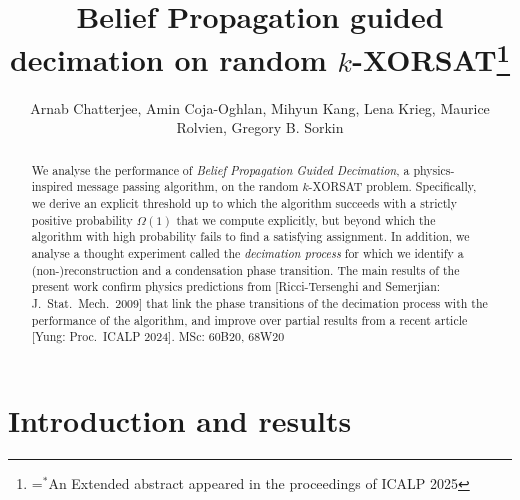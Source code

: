 \documentclass[10pt,reqno]{amsart}
\makeatletter
\numberwithin{equation}{section}
\newcommand{\RTS}{Ricci-Tersenghi and Semerjian}
\newcommand{\definetitlefootnote}[1]{\newcommand\addtitlefootnote{\makebox[0pt][l]{$^{*}$}\footnote{\protect\@titlefootnotetext}
	}\newcommand\@titlefootnotetext{\spaceskip=\z@skip $^{*}$#1}}
\makeatother
\begin{document}

\definetitlefootnote{An Extended abstract appeared in the proceedings of ICALP 2025}
\title{Belief Propagation guided decimation on random $k$-XORSAT\addtitlefootnote}
\author{Arnab Chatterjee, Amin Coja-Oghlan, Mihyun Kang, Lena Krieg, Maurice Rolvien, Gregory B. Sorkin}

\address{Arnab Chatterjee, {\tt arnab.chatterjee@tu-dortmund.de}, TU Dortmund, Faculty of Computer Science, 12 Otto-Hahn-St, 44227 Dortmund, Germany.}
\address{Amin Coja-Oghlan, {\tt amin.coja-oghlan@tu-dortmund.de}, TU Dortmund, Faculty of Computer Science and Faculty of Mathematics, 12 Otto-Hahn-St, 44227 Dortmund, Germany.}
\address{Mihyun Kang, {\tt kang@math.tugraz.at}, TU Graz, Institute of Discrete Mathematics, Steyrergasse 30, 8010 Graz, Austria.}
\address{Lena Krieg, {\tt lena.krieg@tu-dortmund.de}, TU Dortmund, Faculty of Computer Science, 12 Otto-Hahn-St, 44227 Dortmund, Germany.}
\address{Maurice Rolvien, {\tt maurice.rolvien@tu-dortmund.de}, University of Hamburg, Department of Informatics, Vogt-Kölln-Str. 30, 22527 Hamburg, Germany.}
\address{Gregory B. Sorkin, {\tt g.b.sorkin@lse.ac.uk}, The London School of Economics and Political Science, Department of Mathematics, Columbia House, Houghton St, London WC2A 2AE, United Kingdom}
\maketitle
\begin{abstract}
	We analyse the performance of {\em Belief Propagation Guided Decimation}, a physics-inspired message passing algorithm, on the random $k$-XORSAT problem.
	Specifically, we derive an explicit threshold up to which the algorithm succeeds with a strictly positive probability $\Omega(1)$ that we compute explicitly, but beyond which the algorithm with high probability fails to find a satisfying assignment.
	In addition, we analyse a thought experiment called the {\em decimation process} for which we identify a (non-)reconstruction and a condensation phase transition.
	The main results of the present work confirm physics predictions from [\RTS: J.\ Stat.\ Mech.\ 2009] that link the phase transitions of the decimation process with the performance of the algorithm, and improve over partial results from a recent article [Yung: Proc.\ ICALP 2024].
\hfill MSc: 60B20, 68W20
\end{abstract}
\section{Introduction and results}\label{Sec_not_intro}
\end{document}
